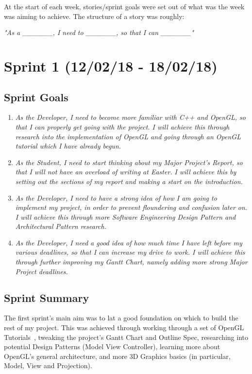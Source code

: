\documentclass[a4paper,10pt]{report}
\begin{document}
At the start of each week, stories/sprint goals were set out of what was the week was aiming to achieve. The structure of a story was roughly:\medskip

\textit{"As a \_\_\_\_\_\_, I need to \_\_\_\_\_\_, so that I can \_\_\_\_\_\_"}

\section{Sprint 1 (12/02/18 - 18/02/18)}

\subsection{Sprint Goals}

\begin{enumerate}
  \item \textit{As the Developer, I need to become more familiar with C++ and OpenGL, so that I can properly get going with the project. I will achieve this through research into the implementation of OpenGL and going through an OpenGL tutorial which I have already begun.}
  
  \item \textit{As the Student, I need to start thinking about my Major Project's Report, so that I will not have an overload of writing at Easter. I will achieve this by setting out the sections of my report and making a start on the introduction.}
  \item \textit{As the Developer, I need to have a strong idea of how I am going to implement my project, in order to prevent floundering and confusion later on. I will achieve this through more Software Engineering Design Pattern and Architectural Pattern research. }
\item \textit{As the Developer, I need a good idea of how much time I have left before my various deadlines, so that I can increase my drive to work. I will achieve this through further improving my Gantt Chart, namely adding more strong Major Project deadlines. }

\end{enumerate}

\subsection{Sprint Summary}

The first sprint's main aim was to lat a good foundation on which to build the rest of my project. This was achieved through working through a set of OpenGL Tutorials~\cite{OpenGL_tutorial}, tweaking the project's Gantt Chart and Outline Spec, researching into potential Design Patterns (Model View Controller), learning more about OpenGL's general architecture, and more 3D Graphics basics (in particular, Model, View and Projection). \medskip
\end{document}
